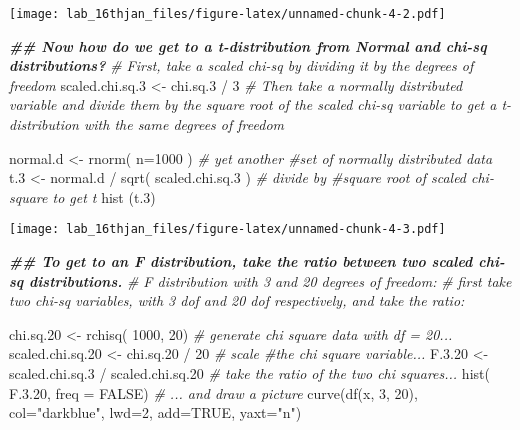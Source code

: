 \documentclass[
]{article}
\newenvironment{Shaded}{\begin{snugshade}}{\end{snugshade}}
\newcommand{\AttributeTok}[1]{\textcolor[rgb]{0.77,0.63,0.00}{#1}}
\newcommand{\CommentTok}[1]{\textcolor[rgb]{0.56,0.35,0.01}{\textit{#1}}}
\newcommand{\ConstantTok}[1]{\textcolor[rgb]{0.00,0.00,0.00}{#1}}
\newcommand{\DecValTok}[1]{\textcolor[rgb]{0.00,0.00,0.81}{#1}}
\newcommand{\DocumentationTok}[1]{\textcolor[rgb]{0.56,0.35,0.01}{\textbf{\textit{#1}}}}
\newcommand{\FloatTok}[1]{\textcolor[rgb]{0.00,0.00,0.81}{#1}}
\newcommand{\FunctionTok}[1]{\textcolor[rgb]{0.00,0.00,0.00}{#1}}
\newcommand{\NormalTok}[1]{#1}
\newcommand{\OtherTok}[1]{\textcolor[rgb]{0.56,0.35,0.01}{#1}}
\newcommand{\SpecialCharTok}[1]{\textcolor[rgb]{0.00,0.00,0.00}{#1}}
\newcommand{\StringTok}[1]{\textcolor[rgb]{0.31,0.60,0.02}{#1}}
\begin{document}
\texttt{[image: lab\_16thjan\_files/figure-latex/unnamed-chunk-4-2.pdf]}

\begin{Shaded}
\begin{Highlighting}[]
\DocumentationTok{\#\# Now how do we get to a t{-}distribution from Normal and chi{-}sq distributions?}
\CommentTok{\# First, take a scaled chi{-}sq by dividing it by the degrees of freedom}
\NormalTok{scaled.chi.sq}\FloatTok{.3} \OtherTok{\textless{}{-}}\NormalTok{ chi.sq}\FloatTok{.3} \SpecialCharTok{/} \DecValTok{3}
\CommentTok{\# Then take a normally distributed variable and divide them by the square root of the scaled chi{-}sq variable to get a t{-}distribution with the same degrees of freedom}

\NormalTok{normal.d }\OtherTok{\textless{}{-}} \FunctionTok{rnorm}\NormalTok{( }\AttributeTok{n=}\DecValTok{1000}\NormalTok{ )                }\CommentTok{\# yet another \#set of normally distributed data}
\NormalTok{t}\FloatTok{.3} \OtherTok{\textless{}{-}}\NormalTok{ normal.d }\SpecialCharTok{/} \FunctionTok{sqrt}\NormalTok{( scaled.chi.sq}\FloatTok{.3}\NormalTok{ )  }\CommentTok{\# divide by \#square root of scaled chi{-}square to get t}
\FunctionTok{hist}\NormalTok{ (t}\FloatTok{.3}\NormalTok{)}
\end{Highlighting}
\end{Shaded}

\texttt{[image: lab\_16thjan\_files/figure-latex/unnamed-chunk-4-3.pdf]}

\begin{Shaded}
\begin{Highlighting}[]
\DocumentationTok{\#\# To get to an F distribution, take the ratio between two scaled chi{-}sq distributions.}
\CommentTok{\# F distribution with 3 and 20 degrees of freedom:}
\CommentTok{\# first take two chi{-}sq variables, with 3 dof and 20 dof respectively, and take the ratio:}

\NormalTok{chi.sq}\FloatTok{.20} \OtherTok{\textless{}{-}} \FunctionTok{rchisq}\NormalTok{( }\DecValTok{1000}\NormalTok{, }\DecValTok{20}\NormalTok{)                 }\CommentTok{\# generate chi square data with df = 20...}
\NormalTok{scaled.chi.sq}\FloatTok{.20} \OtherTok{\textless{}{-}}\NormalTok{ chi.sq}\FloatTok{.20} \SpecialCharTok{/} \DecValTok{20}             \CommentTok{\# scale \#the chi square variable...}
\NormalTok{F.}\FloatTok{3.20} \OtherTok{\textless{}{-}}\NormalTok{  scaled.chi.sq}\FloatTok{.3}  \SpecialCharTok{/}\NormalTok{ scaled.chi.sq}\FloatTok{.20} \CommentTok{\# take the ratio of the two chi squares...}
\FunctionTok{hist}\NormalTok{( F.}\FloatTok{3.20}\NormalTok{, }\AttributeTok{freq =} \ConstantTok{FALSE}\NormalTok{)                                 }\CommentTok{\# ... and draw a picture}
\FunctionTok{curve}\NormalTok{(}\FunctionTok{df}\NormalTok{(x, }\DecValTok{3}\NormalTok{, }\DecValTok{20}\NormalTok{), }
      \AttributeTok{col=}\StringTok{"darkblue"}\NormalTok{, }\AttributeTok{lwd=}\DecValTok{2}\NormalTok{, }\AttributeTok{add=}\ConstantTok{TRUE}\NormalTok{, }\AttributeTok{yaxt=}\StringTok{"n"}\NormalTok{)}
\end{Highlighting}
\end{Shaded}
\end{document}
